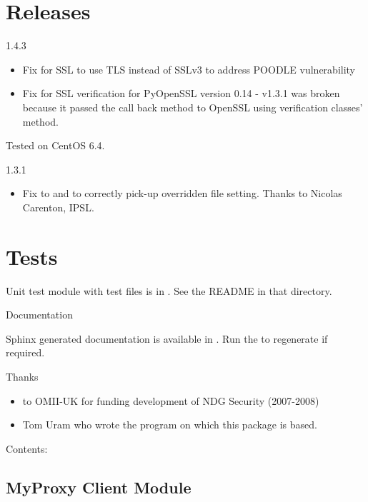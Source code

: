 \documentclass[letterpaper,10pt,english]{sphinxmanual}
\begin{document}


\chapter{Releases}
\label{index:releases}
1.4.3
\begin{itemize}
\item {} 
Fix for SSL to use TLS instead of SSLv3 to address POODLE vulnerability

\item {} 
Fix for SSL verification for PyOpenSSL version 0.14 - v1.3.1 was broken
because it passed the call back method to OpenSSL using verification classes'
 method.

\end{itemize}

Tested on CentOS 6.4.

1.3.1
\begin{itemize}
\item {} 
Fix to  and 
to correctly pick-up overridden file setting.  Thanks to Nicolas Carenton,
IPSL.

\end{itemize}


\chapter{Tests}
\label{index:tests}
Unit test module with test files is in .  See the README in that
directory.

Documentation

Sphinx generated documentation is available in .  Run the
 to regenerate if required.

Thanks
\begin{itemize}
\item {} 
to OMII-UK for funding development of NDG Security (2007-2008)

\item {} 
Tom Uram who wrote the  program on which this package is
based.

\end{itemize}

Contents:


\section{MyProxy Client Module}
\label{client:myproxy-client-module}\label{client::doc}
\end{document}
